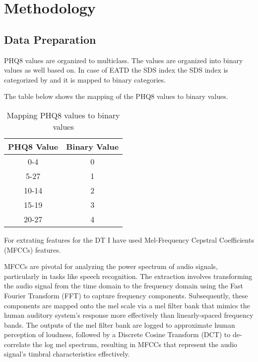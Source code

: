 \section{Methodology}

\subsection{Data Preparation}

PHQ8 values are organized to  multiclass\cite{kroenke2001phq}. The values are organized into binary values as well based on\cite{kroenke2009phq}. In case of EATD the SDS index the SDS index is categorized by and it is mapped to binary categories.

The table below shows the mapping of the PHQ8 values to binary values.

\begin{table}[H]
    \centering
    \begin{tabular}{|c|c|}
    \hline
    PHQ8 Value & Binary Value \\ \hline
    0-4        & 0            \\ \hline
    5-27       & 1            \\ \hline
    10-14      & 2            \\ \hline
    15-19      & 3            \\ \hline
    20-27      & 4            \\ \hline
    \end{tabular}
    \caption{Mapping
    PHQ8 values to binary values}
    \label{tab:phq8 to binary mapping}

For extrating features for the DT I have used Mel-Frequency Cepstral Coefficients (MFCCs)\cite{tiwari2010mfcc} features. 

MFCCs are pivotal for analyzing the power spectrum of audio signals, particularly in tasks like speech recognition. The extraction involves transforming the audio signal from the time domain to the frequency domain using the Fast Fourier Transform (FFT) to capture frequency components. Subsequently, these components are mapped onto the mel scale via a mel filter bank that mimics the human auditory system's response more effectively than linearly-spaced frequency bands. The outputs of the mel filter bank are logged to approximate human perception of loudness, followed by a Discrete Cosine Transform (DCT) to de-correlate the log mel spectrum, resulting in MFCCs that represent the audio signal's timbral characteristics effectively.


\end{table}
